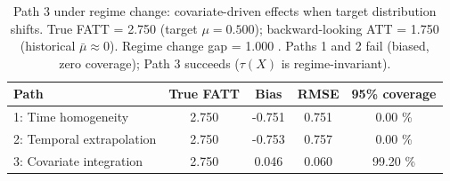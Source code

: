 \begin{table}[htbp]
\centering
\caption{Path 3 under regime change: covariate-driven effects when target distribution shifts. True FATT = 
2.750
 (target $\mu=
0.500
$); backward-looking ATT = 
1.750
 (historical $\bar{\mu} \approx 0$). Regime change gap = 
1.000
. Paths 1 and 2 fail (biased, zero coverage); Path 3 succeeds ($\tau(X)$ is regime-invariant).}
\label{tab:path3}
\begin{tabular}{lcccc}
\toprule
Path & True FATT & Bias & RMSE & 95\% coverage \\
\midrule
1: Time homogeneity & 
2.750
 & 
-0.751
 & 
0.751
 & 
0.00
\% \\
2: Temporal extrapolation & 
2.750
 & 
-0.753
 & 
0.757
 & 
0.00
\% \\
3: Covariate integration & 
2.750
 & 
0.046
 & 
0.060
 & 
99.20
\% \\
\bottomrule
\end{tabular}
\end{table}
